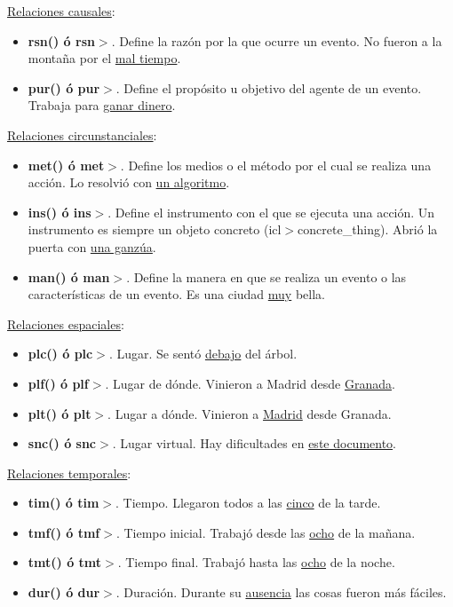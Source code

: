 \documentclass{article}
\begin{document}
\begin{multicols*}{3}
\underline{Relaciones causales}:

\begin{itemize}[itemsep=0pt, parsep=0pt, leftmargin=1em]
    \item \textbf{rsn() ó rsn$>$}. Define la razón por la que ocurre un evento. No fueron a la montaña por el \underline{mal tiempo}.
    \item \textbf{pur() ó pur$>$}. Define el propósito u objetivo del agente de un evento. Trabaja para \underline{ganar dinero}.
\end{itemize}

\underline{Relaciones circunstanciales}:

\begin{itemize}[itemsep=0pt, parsep=0pt, leftmargin=1em]
    \item \textbf{met() ó met$>$}. Define los medios o el método por el cual se realiza una acción. Lo resolvió con \underline{un algoritmo}.
    \item \textbf{ins() ó ins$>$}. Define el instrumento con el que se ejecuta una acción. Un
    instrumento es siempre un objeto concreto (icl$>$concrete\_thing). Abrió la puerta con \underline{una ganzúa}.
    \item \textbf{man() ó man$>$}. Define la manera en que se realiza un evento o las características de un evento. Es una ciudad \underline{muy} bella.
\end{itemize}
    
\underline{Relaciones espaciales}:

\begin{itemize}[itemsep=0pt, parsep=0pt, leftmargin=1em]
    \item \textbf{plc() ó plc$>$}. Lugar. Se sentó \underline{debajo} del árbol.
    \item \textbf{plf() ó plf$>$}. Lugar de dónde. Vinieron a Madrid desde \underline{Granada}.
    \item \textbf{plt() ó plt$>$}. Lugar a dónde. Vinieron a \underline{Madrid} desde Granada.
    \item \textbf{snc() ó snc$>$}. Lugar virtual. Hay dificultades en \underline{este documento}.
\end{itemize}

\underline{Relaciones temporales}:

\begin{itemize}[itemsep=0pt, parsep=0pt, leftmargin=1em]
    \item \textbf{tim() ó tim$>$}. Tiempo. Llegaron todos a las \underline{cinco} de la tarde.
    \item \textbf{tmf() ó tmf$>$}. Tiempo inicial. Trabajó desde las \underline{ocho} de la mañana.
    \item \textbf{tmt() ó tmt$>$}. Tiempo final. Trabajó hasta las \underline{ocho} de la noche.
    \item \textbf{dur() ó dur$>$}. Duración. Durante su \underline{ausencia} las cosas fueron más fáciles.
\end{itemize}


\end{multicols*}
\end{document}
